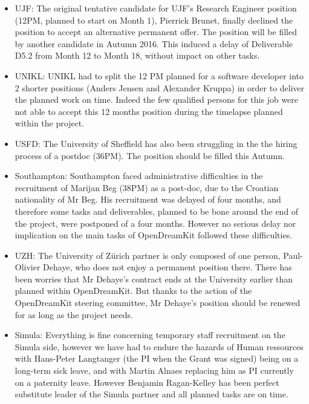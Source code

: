 \documentclass{deliverablereport}
\begin{document}
\begin{itemize}
\item{UJF:} The original tentative candidate for UJF's Research
  Engineer position (12PM, planned to start on Month 1), Pierrick
  Brunet, finally declined the position to accept an alternative
  permanent offer. The position will be filled by another candidate in
  Autumn 2016. This induced a delay of Deliverable D5.2 from Month 12
  to Month 18, without impact on other tasks.

\item{UNIKL:} UNIKL had to split the 12 PM planned for a software developer into 2 shorter positions (Anders Jensen and Alexander Kruppa) in order to deliver the planned work on time. Indeed the few qualified persons for this job were not able to accept this 12 months position during the timelapse planned within the project.\\

\item{USFD:} The University of Sheffield has also been struggling in the the hiring process of a postdoc (36PM). The position should be filled this Autumn.\\

\item{Southampton:} Southampton faced administrative difficulties in the recruitment of Marijan Beg (38PM) as a post-doc, due to the Croatian nationality of Mr Beg. His recruitment was delayed of four months, and therefore some tasks and deliverables, planned to be bone around the end of the project, were postponed of a four months. However no serious delay nor implication on the main tasks of OpenDreamKit followed these difficulties.

\item{UZH:} The University of Zürich partner is only composed of one person, Paul-Olivier Dehaye, who does not enjoy a permanent position there. There has been worries that Mr Dehaye's contract ends at the University earlier than planned within OpenDreamKit. But thanks to the action of the OpenDreamKit steering committee, Mr Dehaye's position should be renewed for as long as the project needs.\\

\item{Simula:} Everything is fine concerning temporary staff recruitment on the Simula side, however we have had to endure the hazards of Human ressources with Hans-Peter Langtanger (the PI when the Grant was signed) being on a long-term sick leave, and with Martin Alnaes replacing him as PI currently on a paternity leave. However Benjamin Ragan-Kelley has been perfect  substitute leader of the Simula partner and all planned tasks are on time.
\end{itemize}
\end{document}
